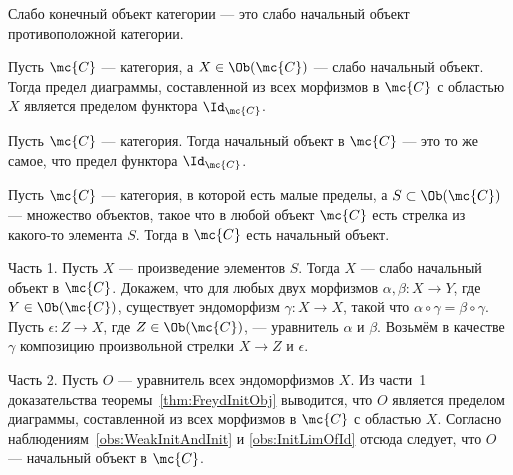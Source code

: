 \documentclass[
	extrafontsizes,
	11pt,
	hyphens,
]{memoir}
\begin{document}
\begin{definition}
Слабо конечный объект категории --- это слабо начальный объект противоположной категории.
\end{definition}

\begin{observation}
Пусть \(\mc{C}\) --- категория, а \(X \in \Ob(\mc{C})\) --- слабо начальный объект.%
\label{obs:WeakInitAndInit}
Тогда предел диаграммы, составленной из всех морфизмов в \(\mc{C}\) с областью \(X\) является пределом функтора \(\Id_{\mc{C}}\).
\end{observation}

\begin{observation}
Пусть \(\mc{C}\) --- категория.%
\label{obs:InitLimOfId}
Тогда начальный объект в \(\mc{C}\) --- это то же самое, что предел функтора \(\Id_{\mc{C}}\).
\end{observation}

\begin{theorem}
Пусть \(\mc{C}\) --- категория, в которой есть малые пределы, а \(S \subset \Ob(\mc{C})\) --- множество объектов, такое что в любой объект \(\mc{C}\) есть стрелка из какого-то элемента \(S\).%
\label{thm:FreydInitObj}
Тогда в \(\mc{C}\) есть начальный объект.
\end{theorem}

\begin{proofparts}

\item[Часть 1.]
Пусть \(X\) --- произведение элементов \(S\). Тогда \(X\) --- слабо начальный объект в \(\mc{C}\).
Докажем, что для любых двух морфизмов \(\alpha, \beta : X \to Y\), где \(Y \in \Ob(\mc{C})\), существует эндоморфизм \(\gamma : X \to X\), такой что \(\alpha \circ \gamma = \beta \circ \gamma\).
Пусть \(\epsilon : Z \to X\), где \(Z \in \Ob(\mc{C})\), --- уравнитель \(\alpha\) и \(\beta\). Возьмём в качестве \(\gamma\) композицию произвольной стрелки \(X \to Z\) и \(\epsilon\).

\item[Часть 2.]
Пусть \(O\) --- уравнитель всех эндоморфизмов \(X\).
Из части~1 доказательства теоремы~\ref{thm:FreydInitObj} выводится, что \(O\) является пределом диаграммы, составленной из всех морфизмов в \(\mc{C}\) с областью \(X\).
Согласно наблюдениям~\ref{obs:WeakInitAndInit} и \ref{obs:InitLimOfId} отсюда следует, что \(O\) --- начальный объект в \(\mc{C}\).
\qedhere

\end{proofparts}
\end{document}
